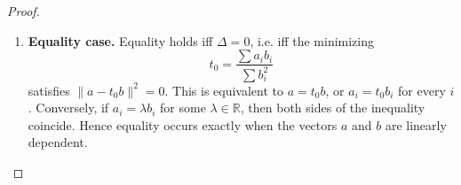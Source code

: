 \begin{proof}
\begin{enumerate}
\item \textbf{Equality case.}
Equality holds iff $\Delta=0$, i.e. iff the minimizing
\[
t_{0}= \frac{\sum a_{i}b_{i}}{\sum b_{i}^{2}}
\]
satisfies $\|a-t_{0}b\|^{2}=0$. This is equivalent to $a=t_{0}b$, or $a_{i}=t_{0}b_{i}$ for every $i$.
Conversely, if $a_{i}=\lambda b_{i}$ for some $\lambda\in\mathbb{R}$, then both sides of the inequality coincide. Hence equality occurs exactly when the vectors $a$ and $b$ are linearly dependent.
\end{enumerate}
\end{proof}